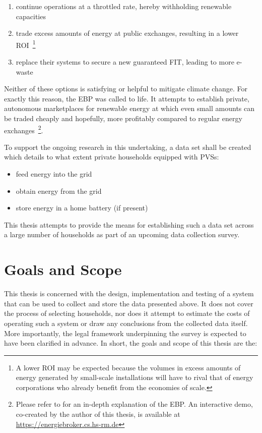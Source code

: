 \begin{enumerate}[label=(\Alph*)]
  \item continue operations at a throttled rate, hereby withholding renewable capacities
  \item trade excess amounts of energy at public exchanges, resulting in a lower \acs{ROI}~\footnote{A lower \acs{ROI} may be expected because the volumes in excess amounts of energy generated by small-scale installations will have to rival that of energy corporations who already benefit from the economies of scale.}
  \item replace their systems to secure a new guaranteed \ac{FIT}, leading to more e-waste
\end{enumerate}

Neither of these options is satisfying or helpful to mitigate climate change. For exactly this reason, the \ac{EBP} was called to life. It attempts to establish private, autonomous marketplaces for renewable energy at which even small amounts can be traded cheaply and hopefully, more profitably compared to regular energy exchanges~\footnote{Please refer to \cite{stoy2019broker} for an in-depth explanation of the \ac{EBP}. An interactive demo, co-created by the author of this thesis, is available at \url{https://energiebroker.cs.hs-rm.de}}.

To support the ongoing research in this undertaking, a data set shall be created which details to what extent private households equipped with \acsp{PVS}:

\begin{itemize}
  \item feed energy into the grid
  \item obtain energy from the grid
  \item store energy in a home battery (if present)
\end{itemize}

This thesis attempts to provide the means for establishing such a data set across a large number of households as part of an upcoming data collection survey.


\section{Goals and Scope}
\label{sec:goals-and-scope}

This thesis is concerned with the design, implementation and testing of a system that can be used to collect and store the data presented above. It does not cover the process of selecting households, nor does it attempt to estimate the costs of operating such a system or draw any conclusions from the collected data itself. More importantly, the legal framework underpinning the survey is expected to have been clarified in advance. In short, the goals and scope of this thesis are the:

